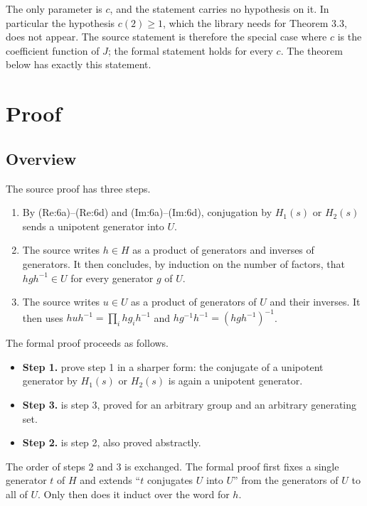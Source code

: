 \documentclass[11pt]{article}
\theoremstyle{definition}
\theoremstyle{remark}
\newcommand{\leanname}[1]{\texttt{\detokenize{#1}}}
\begin{document}
The only parameter is $c$, and the statement carries no hypothesis on it. In particular the hypothesis $c(2)\ge1$, which the library needs for Theorem 3.3, does not appear. The source statement is therefore the special case where $c$ is the coefficient function of $J$; the formal statement holds for every $c$. The theorem \leanname{solution} below has exactly this statement.

\section{Proof}

\subsection{Overview}

The source proof has three steps.
\begin{enumerate}
\item By (Re:6a)--(Re:6d) and (Im:6a)--(Im:6d), conjugation by $H_1(s)$ or $H_2(s)$ sends a unipotent generator into $U$.
\item The source writes $h\in H$ as a product of generators and inverses of generators. It then concludes, by induction on the number of factors, that $hgh^{-1}\in U$ for every generator $g$ of $U$.
\item The source writes $u\in U$ as a product of generators of $U$ and their inverses. It then uses $huh^{-1}=\prod_i hg_ih^{-1}$ and $hg^{-1}h^{-1}=(hgh^{-1})^{-1}$.
\end{enumerate}

The formal proof proceeds as follows.
\begin{itemize}
\item \textbf{Step 1.}  prove step 1 in a sharper form: the conjugate of a unipotent generator by $H_1(s)$ or $H_2(s)$ is again a unipotent generator.
\item \textbf{Step 3.}  is step 3, proved for an arbitrary group and an arbitrary generating set.
\item \textbf{Step 2.}  is step 2, also proved abstractly.
\end{itemize}

The order of steps 2 and 3 is exchanged. The formal proof first fixes a single generator $t$ of $H$ and extends ``$t$ conjugates $U$ into $U$'' from the generators of $U$ to all of $U$. Only then does it induct over the word for $h$.
\end{document}
